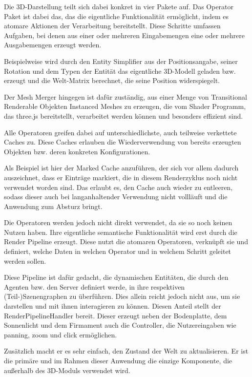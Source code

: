 
Die 3D-Darstellung teilt sich dabei konkret in vier Pakete auf.
Das Operator Paket ist dabei das, das die eigentliche Funktionalität ermöglicht, indem es atomare Aktionen der Verarbeitung bereitstellt.
Diese Schritte umfassen Aufgaben, bei denen aus einer oder mehreren Eingabemengen eine oder mehrere Ausgabemengen erzeugt werden.

Beispielweise wird durch den Entity Simplifier aus der Positionsangabe, seiner Rotation und dem Typen der Entität das eigentliche 3D-Modell geladen bzw. erzeugt
und die Welt-Matrix berechnet, die seine Position widerspiegelt.

Der Mesh Merger hingegen ist dafür zuständig, aus einer Menge von Transitional Renderable Objekten Instanced Meshes zu erzeugen, die vom Shader Programm, das three.js bereitstellt, verarbeitet werden können und besonders effizient sind.

Alle Operatoren greifen dabei auf unterschiedlichste, auch teilweise verkettete Caches zu.
Diese Caches erlauben die Wiederverwendung von bereits erzeugten Objekten bzw. deren konkreten Konfigurationen.

Als Beispiel ist hier der Marked Cache anzuführen, der sich vor allem dadurch auszeichnet, dass er Einträge markiert, die in diesem Renderzyklus noch nicht verwendet worden sind.
Das erlaubt es, den Cache auch wieder zu entleeren, sodass dieser auch bei langanhaltender Verwendung nicht vollläuft und die Anwendung zum Absturz bringt.

Die Operatoren werden jedoch nicht direkt verwendet, da sie so noch keinen Nutzen haben.
Ihre eigentliche semantische Funktionalität wird erst durch die Render Pipeline erzeugt.
Diese nutzt die atomaren Operatoren, verknüpft sie und definiert, welche Daten in welchen Operator und in welchem Schritt geleitet werden sollen.

Diese Pipeline ist dafür gedacht, die dynamischen Entitäten, die durch den Agenten bzw. den Server definiert werde, in ihre respektiven (Teil-)Szenen\-graphen zu überführen.
Dies allein reicht jedoch nicht aus, um sie darstellen und mit ihnen interagieren zu können.
Diesen Anteil stellt der RenderPipelineHandler bereit.
Dieser erzeugt neben der Bodenplatte, dem Sonnenlicht und dem Firmament auch die Controller, die Nutzereingaben wie panning, zoom und click ermöglichen.

Zusätzlich macht er es sehr einfach, den Zustand der Welt zu aktualisieren.
Er ist die primäre und im Rahmen dieser Anwendung die einzige Komponente, die außerhalb des 3D-Moduls verwendet wird.

